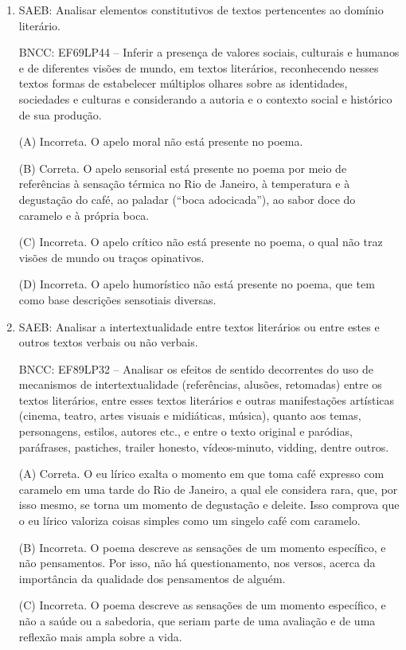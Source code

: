 \begin{enumerate} 
\item
SAEB: Analisar elementos constitutivos de textos pertencentes ao domínio
literário. 

BNCC: EF69LP44 -- Inferir a presença de valores sociais,
culturais e humanos e de diferentes visões de mundo, em textos
literários, reconhecendo nesses textos formas de estabelecer múltiplos
olhares sobre as identidades, sociedades e culturas e considerando a
autoria e o contexto social e histórico de sua produção.

(A) Incorreta. O apelo moral não está presente no poema.

(B) Correta. O apelo sensorial está presente no poema por meio de
referências à sensação térmica no Rio de Janeiro, à temperatura e à
degustação do café, ao paladar (``boca adocicada''), ao sabor doce do
caramelo e à própria boca.

(C) Incorreta. O apelo crítico não está presente no poema, o qual não traz visões de mundo ou traços opinativos.

(D) Incorreta. O apelo humorístico não está presente no poema, que tem como base descrições sensotiais diversas.

\item

SAEB: Analisar a intertextualidade entre textos literários ou entre
estes e outros textos verbais ou não verbais. 

BNCC: EF89LP32 -- Analisar
os efeitos de sentido decorrentes do uso de mecanismos de
intertextualidade (referências, alusões, retomadas) entre os textos
literários, entre esses textos literários e outras manifestações
artísticas (cinema, teatro, artes visuais e midiáticas, música), quanto
aos temas, personagens, estilos, autores etc., e entre o texto original
e paródias, paráfrases, pastiches, trailer honesto, vídeos-minuto,
vidding, dentre outros.

(A) Correta. O eu lírico exalta o momento em que toma café expresso com
caramelo em uma tarde do Rio de Janeiro, a qual ele considera rara, que,
por isso mesmo, se torna um momento de degustação e deleite. Isso
comprova que o eu lírico valoriza coisas simples como um singelo café
com caramelo.

(B) Incorreta. O poema descreve as sensações de um momento específico, e
não pensamentos. Por isso, não há questionamento, nos versos, acerca da importância da qualidade dos pensamentos de alguém.

(C) Incorreta. O poema descreve as sensações de um momento específico, e
não a saúde ou a sabedoria, que seriam parte de uma avaliação e de uma reflexão mais ampla sobre a vida.


\end{enumerate}
